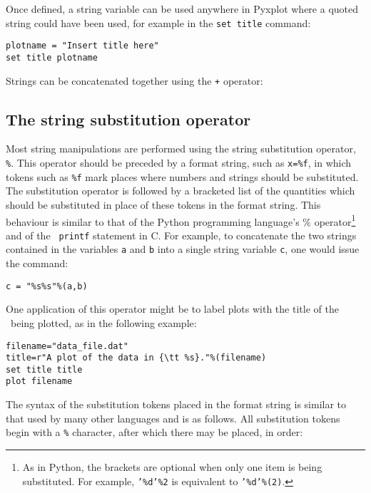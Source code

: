 Once defined, a string variable can be used anywhere in Pyxplot where a quoted
string could have been used, for example in the {\tt set title} command:

\begin{verbatim}
plotname = "Insert title here"
set title plotname
\end{verbatim}

Strings can be concatenated together using the {\tt +} operator:

\vspace{3mm}

\vspace{3mm}

\subsection{The string substitution operator}
\label{sec:stringsubop}

Most string manipulations are performed using the string substitution operator,
{\tt \%}. This operator should be preceded
by a format string, such as {\tt x=\%f}, in which tokens such as {\tt \%f} mark
places where numbers and strings should be substituted. The substitution
operator is followed by a bracketed list of the quantities which should be
substituted in place of these tokens in the format string. This behaviour is
similar to that of the Python programming language's \% operator\footnote{As in
Python, the brackets are optional when only one item is being substituted. For
example, {\tt '\%d'\%2} is equivalent to {\tt '\%d'\%(2)}.} and of the {\tt
printf} statement in C.  For example, to concatenate the two strings contained
in the variables {\tt a} and {\tt b} into a single string variable {\tt c}, one
would issue the command:

\begin{verbatim}
c = "%s%s"%(a,b)
\end{verbatim}

One application of this operator might be to label plots with the title of the
\datafile\ being plotted, as in the following example:
\begin{verbatim}
filename="data_file.dat"
title=r"A plot of the data in {\tt %s}."%(filename)
set title title
plot filename
\end{verbatim}

The syntax of the substitution tokens placed in the format string is similar to
that used by many other languages and is as follows. All substitution tokens
begin with a {\tt \%} character, after which there may be placed, in order:

